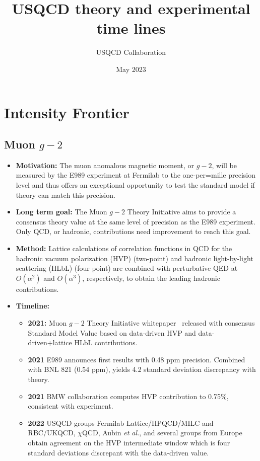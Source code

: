 \documentclass[12pt,hyperpdf]{article}
\title{USQCD theory and experimental time lines}
\author{USQCD Collaboration}
\date{May 2023}
\begin{document}
\maketitle
\tableofcontents

\section{Intensity Frontier}\label{sec:intensity}

\subsection{Muon $g-2$}
\begin{itemize}
    \item{\bf Motivation:} The muon anomalous magnetic moment, or
      $g-2$, will be measured by the E989 experiment at Fermilab to
      the one-per=mille precision level and thus offers an exceptional
      opportunity to test the standard model if theory can match this
      precision. 
    \item{\bf Long term goal:} The Muon $g-2$ Theory Initiative aims
      to provide a consensus theory value at the same level of
      precision as the E989 experiment. Only QCD, or hadronic,
      contributions need improvement to reach this goal.      
    \item{\bf Method:} Lattice  calculations of correlation functions
      in QCD for the hadronic vacuum polarization (HVP) (two-point)
      and hadronic light-by-light scattering (HLbL) (four-point) are
      combined with perturbative QED at $O(\alpha^2)$ and
      $O(\alpha^3)$, respectively, to obtain the leading hadronic
      contributions.  
\item{\bf Timeline:}
\begin{itemize}
    \item{\bf 2021:} Muon $g-2$ Theory Initiative whitepaper~\cite{Aoyama:2020ynm} released with consensus Standard Model Value based on data-driven HVP and data-driven+lattice HLbL contributions.
    \item{\bf 2021} E989 announces first results with 0.48 ppm precision. Combined with BNL 821 (0.54 ppm), yields 4.2 standard deviation discrepancy with theory.
    \item{\bf 2021} BMW collaboration computes HVP contribution to 0.75\%, consistent with experiment. 
    \item{\bf 2022} USQCD groups Fermilab Lattice/HPQCD/MILC and RBC/UKQCD, $\chi$QCD, Aubin {\it et al.}, and several groups from Europe obtain agreement on the HVP intermediate window which is four standard deviations discrepant with the data-driven value.

\end{itemize}
\end{itemize}
\end{document}
